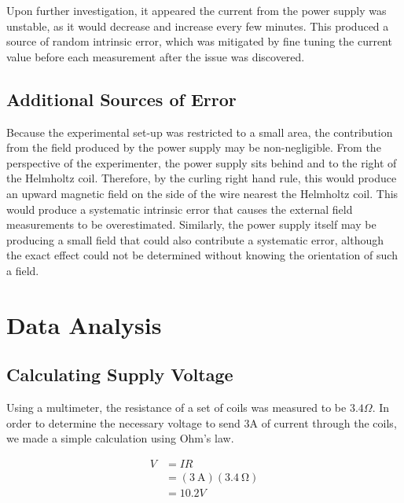 \documentclass[a4paper]{article}
\begin{document}
\qq Upon further investigation, it appeared the current from the power supply was
unstable, as it would decrease and increase every few minutes. This produced a
source of random intrinsic error, which was mitigated by fine tuning the current
value before each measurement after the issue was discovered.

\subsection{Additional Sources of Error}

\qq Because the experimental set-up was restricted to a small area, the contribution
from the field produced by the power supply may be non-negligible. From the
perspective of the experimenter, the power supply sits behind and to the right
of the Helmholtz coil. Therefore, by the curling right hand rule, this would
produce an upward magnetic field on the side of the wire nearest the Helmholtz
coil. This would produce a systematic intrinsic error that causes the external
field measurements to be overestimated. Similarly, the power supply itself may
be producing a small field that could also contribute a systematic error,
although the exact effect could not be determined without knowing the
orientation of such a field.

\section{Data Analysis}


\subsection{Calculating Supply Voltage}

\qq Using a multimeter, the resistance of a set of coils was measured to be
$3.4 \Omega$. In order to determine the necessary voltage to send 3A of current
through the coils, we made a simple calculation using Ohm's law.

\begin{align*}
V &= IR \\
  &= (\SI{3}{\ampere})(\SI{3.4}{\ohm}) \\
  &= 10.2V \\
\end{align*}

\end{document}
